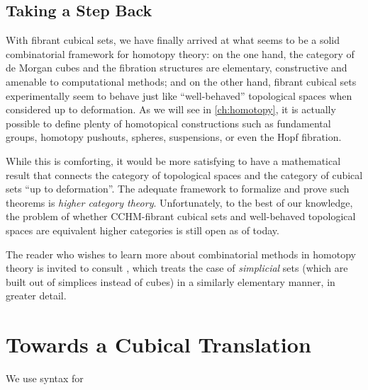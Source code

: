 

\subsection{Taking a Step Back}

With fibrant cubical sets, we have finally arrived at what seems to be a solid 
combinatorial framework for homotopy theory: 
% 
on the one hand, the category of de Morgan cubes and the fibration structures 
are elementary, constructive and amenable to computational methods;
% 
and on the other hand, fibrant cubical sets experimentally seem to behave just like 
``well-behaved'' topological spaces when considered up to deformation. As we
will see in \cref{ch:homotopy}, it is actually possible to define plenty of homotopical
constructions such as fundamental groups, homotopy pushouts, spheres, suspensions, 
or even the Hopf fibration.

While this is comforting, it would be more satisfying to have a mathematical 
result that connects the category of topological spaces and the category of
cubical sets ``up to deformation''. 
% 
The adequate framework to formalize and prove such theorems is \emph{higher 
category theory}. Unfortunately, to the best of our knowledge, the problem of 
whether CCHM-fibrant cubical sets and well-behaved topological spaces are 
equivalent higher categories is still open as of today.

The reader who wishes to learn more about combinatorial methods in homotopy 
theory is invited to consult , which treats the case 
of \emph{simplicial} sets (which are built out of simplices instead of cubes) in a 
similarly elementary manner, in greater detail.

\section{Towards a Cubical Translation}
\label{sec:cubical_trans}

We use \Agda syntax for \SetoidCCplus

